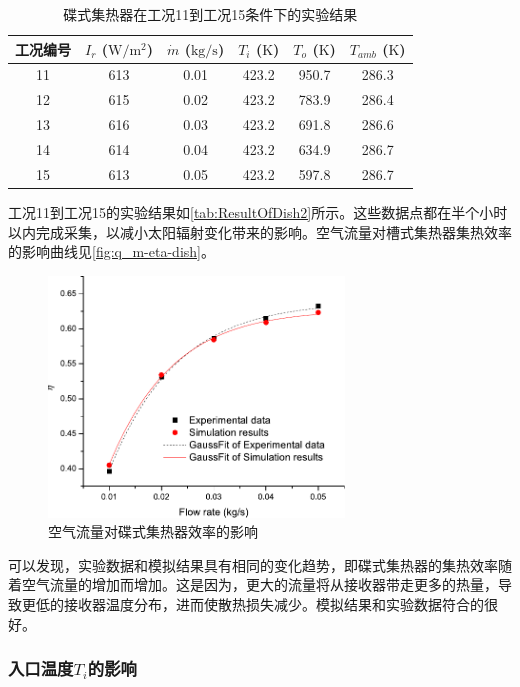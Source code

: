 \begin{table}[htbp]
\setlength{\abovecaptionskip}{0pt}
	\caption{碟式集热器在工况11到工况15条件下的实验结果}
	\centering
	\begin{tabular}{cccccc}
		\toprule
		工况编号	& $I_r$ ($\mathrm{W/m^2}$)	&	$\dot{m}$ ($\mathrm{kg/s}$)			&	$T_i$ ($\mathrm{K}$)	&	$T_o$ ($\mathrm{K}$)		&	$T_{amb}$ ($\mathrm{K}$)\\
		\midrule
		11	&	613	&	0.01	&	423.2	&	950.7	&	286.3\\
		12	&	615	&	0.02	&	423.2	&	783.9	&	286.4\\
		13	&	616	&	0.03	&	423.2	&	691.8	&	286.6	\\
		14	&	614	&	0.04	&	423.2	&	634.9	&	286.7\\
		15	&	613	&	0.05	&	423.2	&	597.8	&	286.7\\
		\bottomrule
	\end{tabular}
	\label{tab:ResultOfDish2}
\end{table}
工况11到工况15的实验结果如\autoref{tab:ResultOfDish2}所示。这些数据点都在半个小时以内完成采集，以减小太阳辐射变化带来的影响。空气流量对槽式集热器集热效率的影响曲线见\autoref{fig:q_m-eta-dish}。

\begin{figure}[!ht]
\centering
\includegraphics[width=0.7\textwidth]{fig/q_m-eta-dish}
\caption{空气流量对碟式集热器效率的影响}
\label{fig:q_m-eta-dish}
\end{figure}

可以发现，实验数据和模拟结果具有相同的变化趋势，即碟式集热器的集热效率随着空气流量的增加而增加。这是因为，更大的流量将从接收器带走更多的热量，导致更低的接收器温度分布，进而使散热损失减少。模拟结果和实验数据符合的很好。

\subsubsection{入口温度$T_i$的影响}

